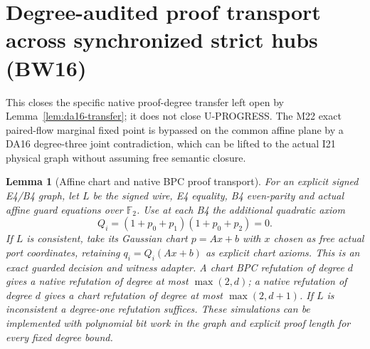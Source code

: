\documentclass[11pt]{article}
\newtheorem{lemma}[theorem]{Lemma}
\begin{document}
\section{Degree-audited proof transport across synchronized strict hubs (BW16)}\label{sec:bw16}
This closes the specific native proof-degree transfer left open by Lemma~\ref{lem:da16-transfer}; it does not close U-PROGRESS. The M22 exact paired-flow marginal fixed point is bypassed on the common affine plane by a DA16 degree-three joint contradiction, which can be lifted to the actual I21 physical graph without assuming free semantic closure.

\begin{lemma}[Affine chart and native BPC proof transport]\label{lem:bw16-transport}
For an explicit signed E4/B4 graph, let $L$ be the signed wire, E4 equality, B4 even-parity and actual affine guard equations over $\mathbb F_2$. Use at each B4 the additional quadratic axiom
\[
 Q_i=(1+p_0+p_1)(1+p_0+p_2)=0.
\]
If $L$ is consistent, take its Gaussian chart $p=Ax+b$ with $x$ chosen as free actual port coordinates, retaining $q_i=Q_i(Ax+b)$ as explicit chart axioms. This is an exact guarded decision and witness adapter. A chart BPC refutation of degree $d$ gives a native refutation of degree at most $\max(2,d)$; a native refutation of degree $d$ gives a chart refutation of degree at most $\max(2,d+1)$. If $L$ is inconsistent a degree-one refutation suffices. These simulations can be implemented with polynomial bit work in the graph and explicit proof length for every fixed degree bound.
\end{lemma}
\end{document}
